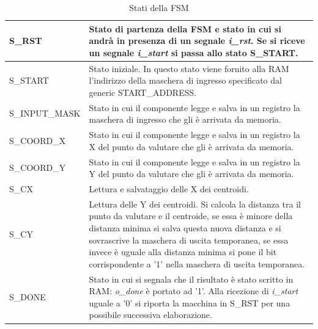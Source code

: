 \documentclass{article}
\begin{document}
\setlength\intextsep{0mm}
\begin{table}[H]
\centering
\caption{Stati della FSM}
\begin{tabu} to 1.0\textwidth { | X[1] | X[4.0] | }
\hline
 S\_RST & Stato di partenza della FSM e stato in cui si andrà in presenza di un segnale \textit{i\_rst}. Se si riceve un segnale \textit{i\_start} si passa allo stato S\_START.\\
\hline
S\_START & Stato iniziale. In questo stato viene fornito alla RAM l'indirizzo della maschera di ingresso specificato dal generic START\_ADDRESS. \\
\hline
S\_INPUT\_MASK & Stato in cui il componente legge e salva in un registro la maschera di ingresso che gli è arrivata da memoria. \\
\hline
S\_COORD\_X & Stato in cui il componente legge e salva in un registro la X del punto da valutare che gli è arrivata da memoria. \\
\hline
S\_COORD\_Y & Stato in cui il componente legge e salva in un registro la Y del punto da valutare che gli è arrivata da memoria. \\
\hline
S\_CX & Lettura e salvataggio delle X dei centroidi. \\
\hline
S\_CY & Lettura delle Y dei centroidi. Si calcola la distanza tra il punto da valutare e il centroide, se essa è minore della distanza minima si salva questa nuova distanza e si sovrascrive la maschera di uscita temporanea, se essa invece è uguale alla distanza minima si pone il bit corrispondente a '1' nella maschera di uscita temporanea. \\
\hline
S\_DONE & Stato in cui si segnala che il risultato è stato scritto in RAM: \textit{o\_done} è portato ad '1'. Alla ricezione di \textit{i\_start} uguale a '0' si riporta la macchina in S\_RST per una possibile successiva elaborazione. \\
\hline
\end{tabu}
\label{tab:FSM}
\end{table}
\end{document}
